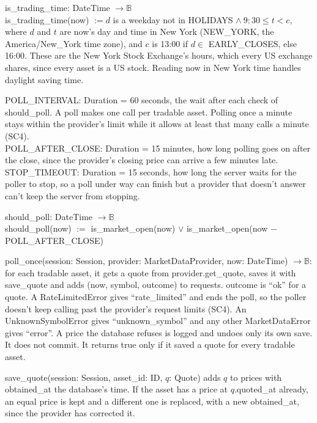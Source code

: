 \documentclass[12pt, titlepage]{article}
\begin{document}
\smallskip
\noindent is\_trading\_time: DateTime $\rightarrow \mathbb{B}$\\
is\_trading\_time(now) $:= d$ is a weekday not in HOLIDAYS $\land\ 9{:}30 \leq
t < c$, where $d$ and $t$ are now's day and time in New York (NEW\_YORK, the
America/New\_York time zone), and $c$ is 13:00 if $d \in$ EARLY\_CLOSES, else
16:00. These are the New York Stock Exchange's hours,
which every US exchange shares, since every asset is a US stock. Reading now in New York time handles daylight saving time.

\smallskip
\noindent POLL\_INTERVAL: Duration = 60 seconds, the wait after each check of
should\_poll. A poll makes one call per tradable asset.
Polling once a minute stays within the provider's limit while it allows at
least that many calls a minute (SC4).\\
POLL\_AFTER\_CLOSE: Duration = 15 minutes, how long polling goes on after the
close, since the provider's closing price can arrive a few minutes late.\\
STOP\_TIMEOUT: Duration = 15 seconds, how long the server waits for the poller
to stop, so a poll under way can finish but a provider that doesn't answer
can't keep the server from stopping.

\smallskip
\noindent should\_poll: DateTime $\rightarrow \mathbb{B}$\\
should\_poll(now) $:=$ is\_market\_open(now) $\lor$ is\_market\_open(now $-$
POLL\_AFTER\_CLOSE)

\smallskip
\noindent poll\_once(session: Session, provider: MarketDataProvider, now:
DateTime) $\rightarrow \mathbb{B}$: for each tradable asset, it gets a quote from provider.get\_quote,
saves it with save\_quote and adds (now, symbol, outcome) to requests. outcome
is ``ok'' for a quote. A RateLimitedError gives ``rate\_limited'' and ends the
poll, so the poller doesn't keep calling past the provider's request limits
(SC4). An UnknownSymbolError gives ``unknown\_symbol'' and any other
MarketDataError gives ``error''. A price the database refuses is logged and
undoes only its own save. It does not commit. It returns true only if it
saved a quote for every tradable asset.

\smallskip
\noindent save\_quote(session: Session, asset\_id: ID, $q$: Quote) adds $q$ to
prices with obtained\_at the database's time. If the asset has a price at
$q$.quoted\_at already, an equal price is kept and a different one is replaced,
with a new obtained\_at, since the provider has corrected it.
\end{document}

